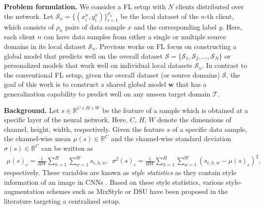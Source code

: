 \documentclass{article}
\theoremstyle{plain}
\theoremstyle{definition}
\theoremstyle{remark}
\begin{document}
\textbf{Problem formulation.} We consider a FL   setup with $N$ clients distributed over the network. Let  $\mathcal{S}_n = \{(x_i^n, y_i^n)\}_{i=1}^{\rho_n}$
 be the local dataset  of the $n$-th client, which
   consists of $\rho_n$ pairs of data sample $x$ and the corresponding label $y$.  Here, each client $n$ can have data samples from either a single  or multiple source domains in its local dataset $\mathcal{S}_n$.  Previous works on  FL focus on constructing a global model that predicts well on the overall dataset   $\mathcal{S}=\{\mathcal{S}_1, \mathcal{S}_2, \dots, \mathcal{S}_N\}$ or personalized models that work well on individual local datasets $\mathcal{S}_n$. In contrast to the conventional FL setup,  given the overall dataset (or source domains) $\mathcal{S}$, the goal of this work is to construct a shared global model $\mathbf{w}$ that has  a generalization capability to predict well on any unseen target domain $\mathcal{T}$. 
 
 
 \textbf{Background.} Let $s\in\mathbb{R}^{C\times H\times W}$ be the feature of a  sample which is obtained at a specific layer of the neural network. Here, $C$, $H$, $W$ denote the dimensions of channel, height, width, respectively. Given the feature $s$ of a specific data sample, the channel-wise mean  $\mu(s)\in \mathbb{R}^C$ and the channel-wise standard deviation $\sigma(s)\in \mathbb{R}^C$ can be written as 
\begin{align}\label{eq:style_statistics}
\mu(s)_c = \frac{1}{HW}\sum_{h=1}^H\sum_{w=1}^Ws_{c,h,w}, \ \ 
\sigma^2(s)_c = \frac{1}{HW}\sum_{h=1}^H\sum_{w=1}^W(s_{c,h,w} - \mu(s)_c)^2,
\end{align}
respectively. These  variables are known as   \textit{style statistics} as they contain style information of an image in CNNs \cite{huang2017arbitrary}.   Based on these style statistics, various style-augmentation schemes such as MixStyle \cite{zhou2021domain} or DSU \cite{li2022uncertainty}  have been proposed in the literature targeting a centralized setup.
\end{document}
